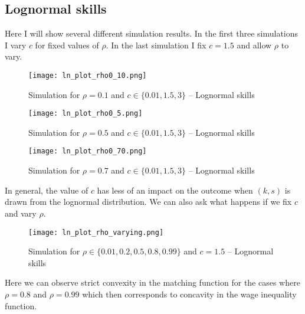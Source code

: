 \documentclass{article}
\begin{document}
\subsection{Lognormal skills}

Here I will show several different simulation results. In the first three simulations I vary $c$ for fixed values of $\rho$. In the last simulation I fix $c=1.5$ and allow $\rho$ to vary.
		\begin{figure}[H]
		\centering
		\texttt{[image: ln\_plot\_rho0\_10.png]}
		\caption{Simulation for $\rho = 0.1$ and $c\in\{0.01,1.5,3\}$ -- Lognormal skills}
	\end{figure}
	\begin{figure}[H]
	\centering
		\texttt{[image: ln\_plot\_rho0\_5.png]}
\caption{Simulation for $\rho = 0.5$ and $c\in\{0.01,1.5,3\}$ -- Lognormal skills}
\end{figure}
	\begin{figure}[H]
	\centering
		\texttt{[image: ln\_plot\_rho0\_70.png]}
\caption{Simulation for $\rho = 0.7$ and $c\in\{0.01,1.5,3\}$ -- Lognormal skills}
\end{figure}

In general, the value of $c$ has less of an impact on the outcome when $(k,s)$ is drawn from the lognormal distribution. We can also ask what happens if we fix $c$ and vary $\rho$.

	\begin{figure}[H]
	\centering
	\texttt{[image: ln\_plot\_rho\_varying.png]}
	\caption{Simulation for $\rho \in\{0.01,0.2,0.5,0.8,0.99\}$ and $c=1.5$ -- Lognormal skills}
\end{figure}

Here we can observe strict convexity in the matching function for the cases where $\rho = 0.8$ and $\rho = 0.99$ which then corresponds to concavity in the wage inequality function. 
	
\end{document}
